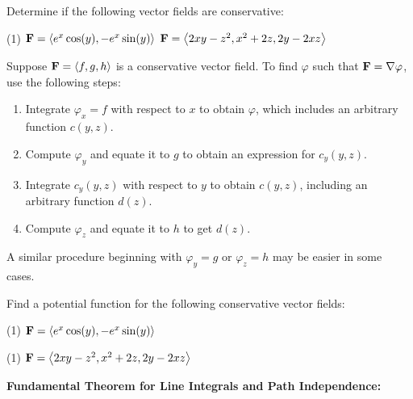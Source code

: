 \documentclass[mathNotesPreamble]{subfiles}
\begin{document}
  \begin{ex*}
    Determine if the following vector fields are conservative:
  \end{ex*}
  \begin{tasks}[after-item-skip=\stretch{1}, label=](1)
    \task $\mathbf F={\left\langle e^x\cos(y),-e^x\sin(y) \right\rangle}$
    \task $\mathbf F={\left\langle 2xy-z^2, x^2+2z, 2y-2xz \right\rangle}$
  \end{tasks}
  \pagebreak

  \begin{thmBox*}
    Suppose $\mathbf F={\left\langle f,g,h \right\rangle}$ is a conservative vector field. To find $\varphi$ such that $\mathbf F=\nabla \varphi$, use the following steps:
    \begin{enumerate}
      \item 
        Integrate $\varphi_x=f$ with respect to $x$ to obtain $\varphi$, which includes an arbitrary function $c(y,z)$.
      \item 
        Compute $\varphi_y$ and equate it to $g$ to obtain an expression for $c_y(y,z)$.
      \item 
        Integrate $c_y(y,z)$ with respect to $y$ to obtain $c(y,z)$, including an arbitrary function $d(z)$.
      \item 
        Compute $\varphi_z$ and equate it to $h$ to get $d(z)$.
    \end{enumerate}
    A similar procedure beginning with $\varphi_y=g$ or $\varphi_z=h$ may be easier in some cases.
  \end{thmBox*}

  \begin{ex*}
    Find a potential function for the following conservative vector fields:
  \end{ex*}
  \begin{tasks}[after-item-skip=\stretch{1}, label=](1)
    \task $\mathbf F={\left\langle e^x\cos(y),-e^x\sin(y) \right\rangle}$
  \end{tasks}
  \pagebreak

  \begin{tasks}[after-item-skip=\stretch{1}, label=](1)
    \task $\mathbf F={\left\langle 2xy-z^2, x^2+2z, 2y-2xz \right\rangle}$
  \end{tasks}
  \pagebreak

  \noindent\textbf{Fundamental Theorem for Line Integrals and Path Independence:}
\end{document}
